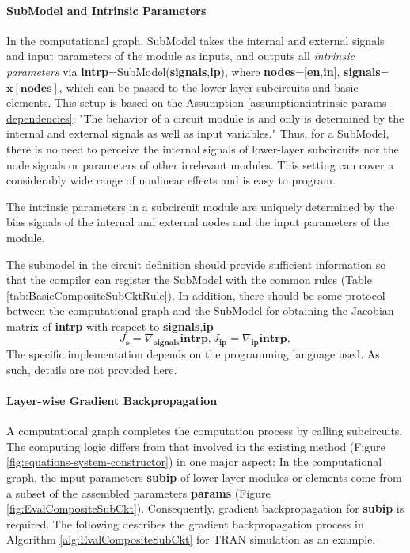 \paragraph{SubModel and Intrinsic Parameters}
In the computational graph, SubModel takes the internal and external signals and input parameters of the module as inputs, and outputs all \textit{intrinsic parameters} via \textbf{intrp}=SubModel(\textbf{signals},\textbf{ip}), where \textbf{nodes}=[\textbf{en},\textbf{in}], \textbf{signals}=$\bm{x}[\textbf{nodes}]$,
which can be passed to the lower-layer subcircuits and basic elements.
This setup is based on the Assumption \ref{assumption:intrinsic-params-dependencies}: "The behavior of a circuit module is and only is determined by the internal and external signals as well as input variables." Thus, for a SubModel, there is no need to perceive the internal signals of lower-layer subcircuits nor the node signals or parameters of other irrelevant modules. This setting can cover a considerably wide range of nonlinear effects and is easy to program.
\begin{assumption}\label{assumption:intrinsic-params-dependencies}
The intrinsic parameters in a subcircuit module are uniquely determined by the bias signals of the internal and external nodes and the input parameters of the module.
\end{assumption}
The submodel in the circuit definition should provide sufficient information so that the compiler can register the SubModel with the common rules (Table \ref{tab:BasicCompositeSubCktRule}).
In addition, there should be some protocol between the computational graph and the SubModel for obtaining the Jacobian matrix of \textbf{intrp} with respect to \textbf{signals},\textbf{ip}
\begin{equation}\label{eq:submodel-jacobian}
J_{\textbf{s}} = \nabla_{\textbf{signals}}\textbf{intrp},
J_{\textbf{ip}}=\nabla_{\textbf{ip}}\textbf{intrp},
\end{equation}
The specific implementation depends on the programming language used. As such, details are not provided here.

\paragraph{Layer-wise Gradient Backpropagation}
A computational graph completes the computation process by calling subcircuits. The computing logic differs from that involved in the existing method (Figure \ref{fig:equations-system-constructor}) in one major aspect: In the computational graph, the input parameters \textbf{subip} of lower-layer modules or elements come from a subset of the assembled parameters \textbf{params} (Figure \ref{fig:EvalCompositeSubCkt}). Consequently, gradient backpropagation for \textbf{subip} is required. The following describes the gradient backpropagation process in Algorithm \ref{alg:EvalCompositeSubCkt} for TRAN simulation as an example.

